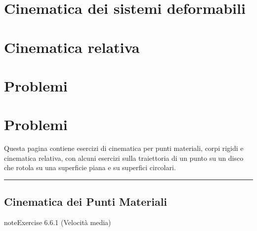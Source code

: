 \documentclass[letterpaper,10pt,italian]{jupyterBook}
\begin{document}
\section{Cinematica dei sistemi deformabili}
\label{\detokenize{ch/mechanics/kinematics-deformable:cinematica-dei-sistemi-deformabili}}\label{\detokenize{ch/mechanics/kinematics-deformable::doc}}
\sphinxstepscope


\section{Cinematica relativa}
\label{\detokenize{ch/mechanics/kinematics-relative:cinematica-relativa}}\label{\detokenize{ch/mechanics/kinematics-relative:physics-hs-mechanics-kinematics-relative}}\label{\detokenize{ch/mechanics/kinematics-relative::doc}}
\sphinxstepscope


\section{Problemi}
\label{\detokenize{ch/mechanics/kinematics-problems:problemi}}\label{\detokenize{ch/mechanics/kinematics-problems:physics-hs-mechanics-kinematics-problems}}\label{\detokenize{ch/mechanics/kinematics-problems::doc}}

\section{Problemi}
\label{\detokenize{ch/mechanics/kinematics-problems:id1}}
\sphinxAtStartPar
Questa pagina contiene esercizi di cinematica per punti materiali, corpi rigidi e cinematica relativa, con alcuni esercizi sulla traiettoria di un punto su un disco che rotola su una superficie piana e su superfici circolari.


\bigskip\hrule\bigskip



\subsection{Cinematica dei Punti Materiali}
\label{\detokenize{ch/mechanics/kinematics-problems:cinematica-dei-punti-materiali}} \label{exercise:ch/mechanics/kinematics-problems-exercise-0}

\begin{sphinxadmonition}{note}{Exercise 6.6.1 (Velocità media)}



\sphinxAtStartPar
{}
\end{sphinxadmonition}
 \label{exercise:ch/mechanics/kinematics-problems-exercise-1}
\end{document}
